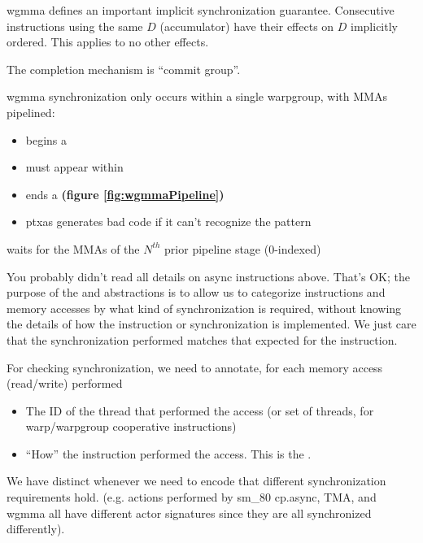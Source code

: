 \filbreak
{}
wgmma defines an important implicit synchronization guarantee.
Consecutive  instructions using the same $D$ (accumulator) have their effects on $D$ implicitly ordered.
This applies to no other effects.

\filbreak
{}
The completion mechanism is ``commit group''.

\filbreak
wgmma synchronization only occurs within a single warpgroup, with MMAs pipelined:

\begin{itemize}
\item {} begins a 
\item {} must appear within 
\item {} ends a  \textbf{(figure \ref{fig:wgmmaPipeline})}
\item ptxas generates bad code if it can't recognize the pattern
\end{itemize}
 waits for the MMAs of the $N^{th}$ prior pipeline stage (0-indexed)

\filbreak
{}

You probably didn't read all details on async instructions above.
That's OK; the purpose of the  and  abstractions is to allow us to categorize instructions and memory accesses by what kind of synchronization is required, without knowing the details of how the instruction or synchronization is implemented.
We just care that the synchronization performed matches that expected for the instruction.

\filbreak
For checking synchronization, we need to annotate, for each memory access (read/write) performed
\begin{itemize}
  \item The ID of the thread that performed the access (or set of threads, for warp/warpgroup cooperative instructions)
  \item ``How'' the instruction performed the access. This is the .
\end{itemize}

\filbreak
We have distinct  whenever we need to encode that different synchronization requirements hold.
(e.g. actions performed by sm\_80 cp.async, TMA, and wgmma all have different actor signatures since they are all synchronized differently).

